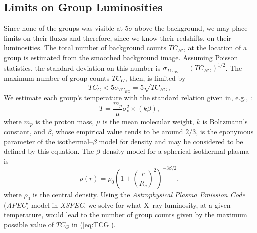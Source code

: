 \documentclass[12pt,preprint]{aastex}
\begin{document}
\subsection{Limits on Group Luminosities}
\label{subsec:limits}
Since none of the groups was visible at $5\sigma$ above the background,
we may place limits on their fluxes and therefore, since we know their
redshifts, on their luminosities.
The total number of background counts $TC_{BG}$ at the location of a group is
estimated from the smoothed background image.  Assuming Poisson statistics,
the standard deviation on this number is
$\sigma_{TC_{BG}} = (TC_{BG})^{1/2}$.  The maximum number of group counts $TC_G$,
then, is limited by
\begin{equation}
TC_G < 5\sigma_{TC_{BG}} = 5 \sqrt{TC_{BG}},
\label{eq:TCG}
\end{equation}
We estimate each group's temperature with the standard relation given in,
e.g., \citet{mulchaey2000}:
\begin{equation}
T = \frac{m_p}{\mu} \sigma_v^2 \times (k \beta),
\label{eq:temp}
\end{equation}
where $m_p$ is the proton mass, $\mu$ is the mean molecular weight, $k$ is
Boltzmann's constant, and $\beta$, whose empirical value tends to be around
$2/3$, is the eponymous parameter of the isothermal--$\beta$ model for 
density and may be considered to be defined by this equation.
The $\beta$ density model for a spherical isothermal plasma is
\begin{equation}
\rho(r) = \rho_0 \left(1 + \left(\frac{r}{R_c}\right)^2\right)^{-3\beta/2},
\label{eq:beta}
\end{equation}
where $\rho_0$ is the central density.
Using the \textsl{Astrophysical Plasma Emission Code} (\textsl{APEC}) model
in \textsl{XSPEC}, we solve for what X--ray luminosity, at a given
temperature, would lead to the number of group counts given by the maximum
possible value of $TC_G$ in (\ref{eq:TCG}).
\end{document}
